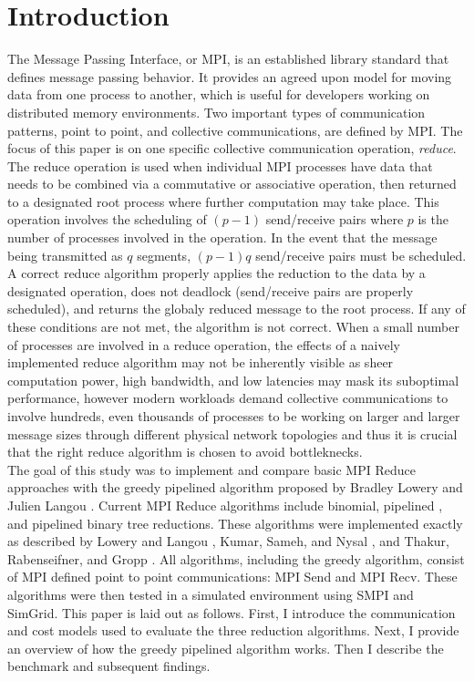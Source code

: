 \documentclass{article}
\begin{document}
\section{Introduction}
The Message Passing Interface, or MPI, is an established library standard that defines message
passing behavior. It provides an agreed upon model for moving data from one process to another, which
is useful for developers working on distributed memory environments. Two important types of 
communication patterns, point to point, and collective communications, are defined by MPI. The focus
of this paper is on one specific collective communication operation, \textit{reduce}. The reduce 
operation is used when individual MPI processes have data that needs to be combined via a commutative
or associative operation, then returned to a designated root process where further computation may 
take place. This operation involves the scheduling of $(p-1)$ send/receive pairs where $p$ is the 
number of processes involved in the operation. In the event that the message being transmitted as $q$
segments, $(p-1)q$ send/receive pairs must be scheduled. A correct reduce algorithm properly 
applies the reduction to the data by a designated operation, does not deadlock (send/receive pairs
are properly scheduled), and returns the globaly reduced message to the root process. If any of 
these conditions are not met, the algorithm is not correct. When a small number of processes are 
involved in a reduce operation, the effects of a naively implemented reduce algorithm may not be 
inherently visible as sheer computation power, high bandwidth, and low latencies may mask its 
suboptimal performance, however modern workloads demand collective communications to involve 
hundreds, even thousands of processes to be working on larger and larger message sizes through 
different physical network topologies and thus it is crucial that the right reduce algorithm is 
chosen to avoid bottleknecks.\\    

The goal of this study was to implement and compare basic MPI Reduce approaches with the
greedy pipelined algorithm proposed by Bradley Lowery and Julien Langou \cite{Lowery-13}. Current 
MPI Reduce algorithms include binomial, pipelined , and pipelined binary tree 
reductions. These algorithms were implemented exactly as described by Lowery and Langou 
\cite{Lowery-13}, Kumar, Sameh, and Nysal \cite{Kumar-16}, and Thakur, Rabenseifner, and Gropp
\cite{Thakur-05}. All algorithms, including the greedy algorithm, consist of MPI defined point to 
point communications: MPI Send and MPI Recv. These algorithms were then tested in a simulated 
environment using SMPI and SimGrid. This paper is laid out as follows. First, I introduce the 
communication and cost models used to evaluate the three reduction algorithms. Next, I provide an 
overview of how the greedy pipelined algorithm works. Then I describe the benchmark and subsequent 
findings.
\end{document}
